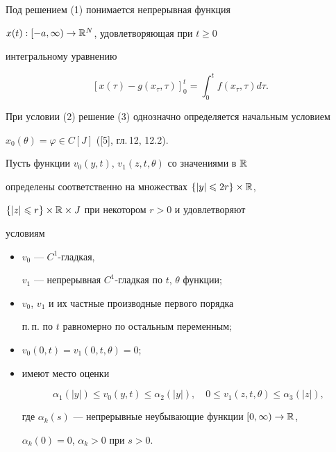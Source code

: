 Под решением (1) понимается непрерывная функция


$x(t):[-a,\infty)\to\Bbb{R}^N$, удовлетворяющая при $t\geqslant0$


интегральному уравнению


\begin{equation}


[x(\tau)-g(x_\tau,\tau)]_0^t=\int_0^tf(x_\tau,\tau)d\tau.


\end{equation}


При условии (2) решение (3) однозначно определяется начальным условием


$x_0(\theta)=\varphi\in C[J]$ ([5], гл.\,12, 12.2).





Пусть функции $v_0(y,t)$, $v_1(z,t,\theta)$ со значениями в $\Bbb{R}$


определены соответственно на множествах $\{|y|\leqslant2r\}\times\Bbb{R}$,


$\{|z|\leqslant r\}\times\Bbb{R}\times J$ при некотором $r>0$ и удовлетворяют


условиям


\begin{itemize}


\item[1)] $v_0$ --- $C^1$-гладкая,


$v_1$ --- непрерывная $C^1$-гладкая по $t$, $\theta$ функции;


\item[2)] $v_0$, $v_1$ и их частные производные первого порядка


п.\,п. по $t$ равномерно по остальным переменным;


\item[3)] $v_0(0,t)=v_1(0,t,\theta)=0$;


\item[4)] имеют место оценки


$$


\alpha_1(|y|)\leqslant v_0(y,t)\leqslant\alpha_2(|y|),\quad


0\leqslant v_1(z,t,\theta)\leqslant\alpha_3(|z|),


$$


где $\alpha_k(s)$ --- непрерывные неубывающие функции $[0,\infty)\to\Bbb{R}$,


$\alpha_k(0)=0$, $\alpha_k>0$ при $s>0$.


\end{itemize}





